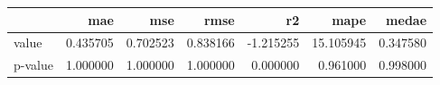 \begin{tabular}{lrrrrrr}
\toprule
 & mae & mse & rmse & r2 & mape & medae \\
\midrule
value & 0.435705 & 0.702523 & 0.838166 & -1.215255 & 15.105945 & 0.347580 \\
p-value & 1.000000 & 1.000000 & 1.000000 & 0.000000 & 0.961000 & 0.998000 \\
\bottomrule
\end{tabular}
